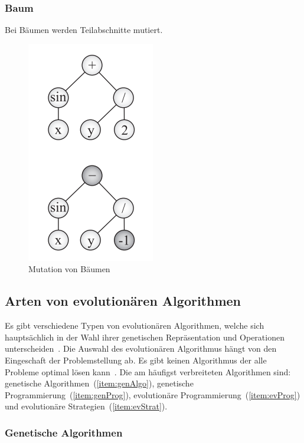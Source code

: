       \subsubsection{Baum}

        Bei Bäumen werden Teilabschnitte mutiert.
        \begin{figure}[H]
            \includegraphics[scale=0.8, center]{graphics/mutation_tree}
            \caption{Mutation von Bäumen \cite[S.29]{book:bioInspired} \label{fig:mutation_tree}}
        \end{figure}


  \subsection{Arten von evolutionären Algorithmen\label{sub:artenEvAlgos}}

    Es gibt verschiedene Typen von evolutionären Algorithmen, welche sich hauptsächlich in der Wahl ihrer genetischen Repräsentation
    und Operationen unterscheiden~\cite{book:introEvComp}.
    Die Auswahl des evolutionären Algorithmus hängt von den Eingeschaft der Problemstellung ab.
    Es gibt keinen Algorithmus der alle Probleme optimal lösen kann~\cite{book:genAlgoDataStructsEvProg}.
    Die am häufigst verbreiteten Algorithmen sind: genetische Algorithmen~(\vref{item:genAlgo}),
    genetische Programmierung~(\vref{item:genProg}), evolutionäre Programmierung~(\vref{item:evProg})
    und evolutionäre Strategien~(\vref{item:evStrat}).

    \subsubsection{Genetische Algorithmen\label{item:genAlgo}}

